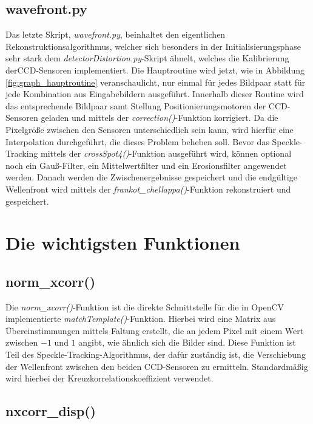 \subsection{wavefront.py}

Das letzte Skript, \textit{wavefront.py}, beinhaltet den eigentlichen Rekonstruktionsalgorithmus, welcher sich besonders in der Initialisierungsphase sehr stark dem \textit{detectorDistortion.py}-Skript ähnelt, welches die Kalibrierung der\gls{CCD}-Sensoren implementiert. Die Hauptroutine wird jetzt, wie in Abbildung \ref{fig:graph_hauptroutine} veranschaulicht, nur einmal für jedes Bildpaar statt für jede Kombination aus Eingabebildern ausgeführt. Innerhalb dieser Routine wird das entsprechende Bildpaar samt Stellung Positionierungsmotoren der \gls{CCD}-Sensoren geladen und mittels der \textit{correction()}-Funktion korrigiert. Da die Pixelgröße zwischen den Sensoren unterschiedlich sein kann, wird hierfür eine Interpolation durchgeführt, die dieses Problem beheben soll. Bevor das Speckle-Tracking mittels der \textit{crossSpot4()}-Funktion ausgeführt wird, können optional noch ein Gauß-Filter, ein Mittelwertfilter und ein Erosionsfilter angewendet werden. Danach werden die Zwischenergebnisse gespeichert und die endgültige Wellenfront wird mittels der \textit{frankot\_chellappa()}-Funktion rekonstruiert und gespeichert. 

\section{Die wichtigsten Funktionen}

\subsection{norm\_xcorr()}

Die \textit{norm\_xcorr()}-Funktion ist die direkte Schnittstelle für die in OpenCV implementierte \textit{matchTemplate()}-Funktion. Hierbei wird eine Matrix aus Übereinstimmungen mittels Faltung erstellt, die an jedem Pixel mit einem Wert zwischen $-1$ und $1$ angibt, wie ähnlich sich die Bilder sind. Diese Funktion ist Teil des Speckle-Tracking-Algorithmus, der dafür zuständig ist, die Verschiebung der Wellenfront zwischen den beiden \gls{CCD}-Sensoren zu ermitteln. Standardmäßig wird hierbei der Kreuzkorrelationskoeffizient verwendet. 

\subsection{nxcorr\_disp()}

